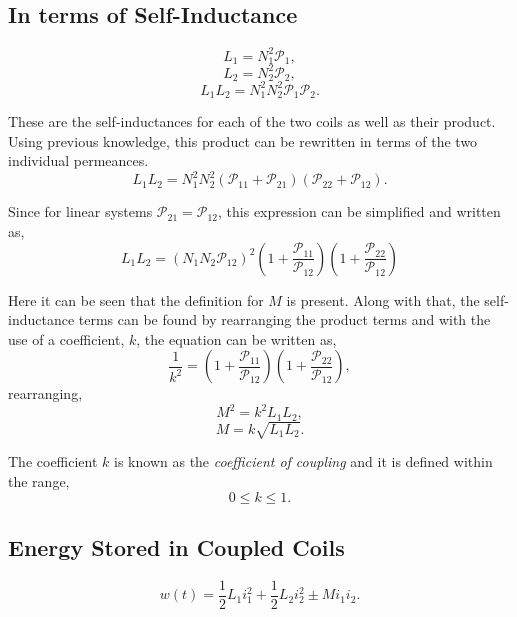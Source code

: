 \documentclass[12pt]{article}
\begin{document}
    \subsection*{In terms of Self-Inductance}
    \[
        L_1 = N_1^2 \mathcal{P}_1,
    \]
    \[
        L_2 = N_2^2 \mathcal{P}_2,
    \]
    \[
        L_1 L_2 = N_1^2 N_2^2 \mathcal{P}_1 \mathcal{P}_2.
    \]
    \par These are the self-inductances for each of the two coils as well as
    their product. Using previous knowledge, this product can be rewritten in
    terms of the two individual permeances.
    \[
        L_1 L_2 = N_1^2 N_2^2 (\mathcal{P}_{11} +
        \mathcal{P}_{21})(\mathcal{P}_{22} + \mathcal{P}_{12})
    .\]
    \par Since for linear systems $\mathcal{P}_{21} = \mathcal{P}_{12}$, this
    expression can be simplified and written as,
    \[
        L_1 L_2 = (N_1N_2\mathcal{P}_{12})^2
        \left( 1 + \frac{\mathcal{P}_{11}}{\mathcal{P}_{12}} \right)
        \left( 1 + \frac{\mathcal{P}_{22}}{\mathcal{P}_{12}} \right)
    \]
    \par Here it can be seen that the definition for $M$ is present. Along with
    that, the self-inductance terms can be found by rearranging the product
    terms and with the use of a coefficient, $k$, the equation can be written
    as,
    \[
        \frac{1}{k^2} =
        \left( 1 + \frac{\mathcal{P}_{11}}{\mathcal{P}_{12}} \right)
        \left( 1 + \frac{\mathcal{P}_{22}}{\mathcal{P}_{12}} \right)
    ,\]
    rearranging,
    \[
        M^2 = k^2 L_1L_2
    ,\]
    \[
        M = k \sqrt{L_1L_2}
    .\]
    \par The coefficient $k$ is known as the \textit{coefficient of coupling}
    and it is defined within the range,
    \[
        0 \le k \le 1
    .\]
    \subsection*{Energy Stored in Coupled Coils}
    \[
        w(t) = \frac{1}{2} L_1 i_1^2 + \frac{1}{2} L_2 i_2^2 \pm Mi_1i_2
    .\]
\end{document}
